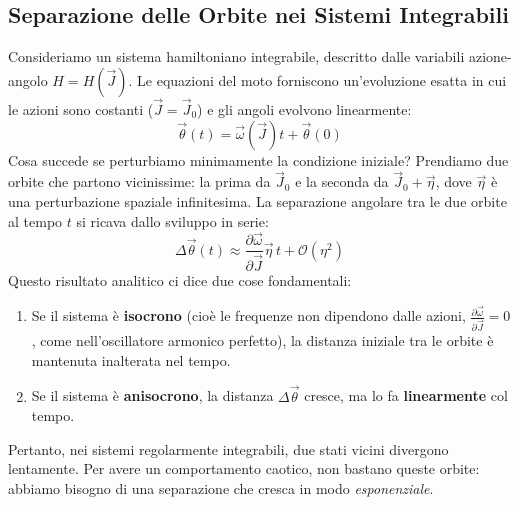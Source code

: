 \documentclass[12pt,a4paper]{article}
\begin{document}
\subsection{Separazione delle Orbite nei Sistemi Integrabili}
Consideriamo un sistema hamiltoniano integrabile, descritto dalle variabili azione-angolo $H = H(\vec{J})$. Le equazioni del moto forniscono un'evoluzione esatta in cui le azioni sono costanti ($\vec{J} = \vec{J}_0$) e gli angoli evolvono linearmente:
\begin{equation}
\vec{\theta}(t) = \vec{\omega}(\vec{J})t + \vec{\theta}(0)
\end{equation}
Cosa succede se perturbiamo minimamente la condizione iniziale? Prendiamo due orbite che partono vicinissime: la prima da $\vec{J}_0$ e la seconda da $\vec{J}_0 + \vec{\eta}$, dove $\vec{\eta}$ è una perturbazione spaziale infinitesima. 
La separazione angolare tra le due orbite al tempo $t$ si ricava dallo sviluppo in serie:
\begin{equation}
\Delta\vec{\theta}(t) \approx \frac{\partial \vec{\omega}}{\partial \vec{J}} \vec{\eta} \, t + \mathcal{O}(\eta^2)
\end{equation}
Questo risultato analitico ci dice due cose fondamentali:
\begin{enumerate}
    \item Se il sistema è \textbf{isocrono} (cioè le frequenze non dipendono dalle azioni, $\frac{\partial \vec{\omega}}{\partial \vec{J}} = 0$, come nell'oscillatore armonico perfetto), la distanza iniziale tra le orbite è mantenuta inalterata nel tempo.
    \item Se il sistema è \textbf{anisocrono}, la distanza $\Delta\vec{\theta}$ cresce, ma lo fa \textbf{linearmente} col tempo.
\end{enumerate}
Pertanto, nei sistemi regolarmente integrabili, due stati vicini divergono lentamente. Per avere un comportamento caotico, non bastano queste orbite: abbiamo bisogno di una separazione che cresca in modo \textit{esponenziale}.
\end{document}
